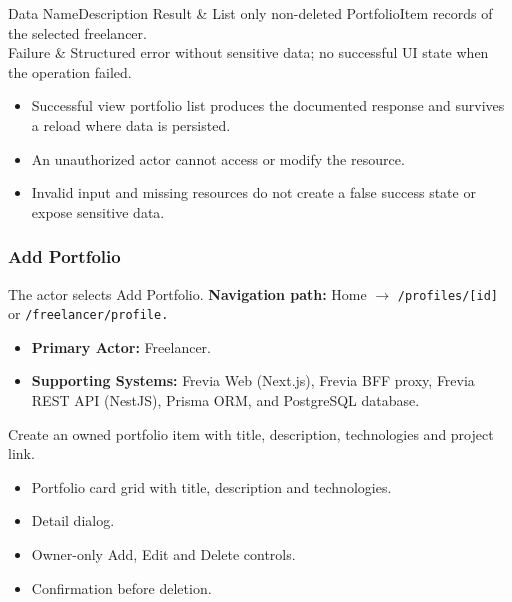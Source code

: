 \begin{specdatatable}{Data Name}{Description}
Result & List only non-deleted PortfolioItem records of the selected freelancer.\\ \hline
Failure & Structured error without sensitive data; no successful UI state when the operation failed.\\ \hline
\end{specdatatable}

\begin{itemize}[leftmargin=1.6em,topsep=3pt,itemsep=2pt,parsep=0pt,label=$\bullet$]
    \item Successful view portfolio list produces the documented response and survives a reload where data is persisted.
    \item An unauthorized actor cannot access or modify the resource.
    \item Invalid input and missing resources do not create a false success state or expose sensitive data.
\end{itemize}

\subsubsection{Add Portfolio}

The actor selects Add Portfolio.\newline
\textbf{Navigation path:} Home $\rightarrow$ \texttt{/\allowbreak{}profiles/\allowbreak{}[id]} or \texttt{/\allowbreak{}freelancer/\allowbreak{}profile.}


\begin{itemize}[leftmargin=1.6em,topsep=3pt,itemsep=2pt,parsep=0pt,label=$\bullet$]
    \item \textbf{Primary Actor:} Freelancer.
    \item \textbf{Supporting Systems:} Frevia Web (Next.js), Frevia BFF proxy, Frevia REST API (NestJS), Prisma ORM, and PostgreSQL database.
\end{itemize}

\noindent Create an owned portfolio item with title, description, technologies and project link.

\begin{itemize}[leftmargin=1.6em,topsep=3pt,itemsep=2pt,parsep=0pt,label=$\bullet$]
    \item Portfolio card grid with title, description and technologies.
    \item Detail dialog.
    \item Owner-only Add, Edit and Delete controls.
    \item Confirmation before deletion.
\end{itemize}

